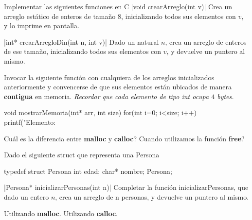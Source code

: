 \documentclass[titlepage,oneside]{book}
\begin{document}
\begin{Exercise} Implementar las siguientes funciones en C
	\Question
		|void crearArreglo(int v)|
		Crea un arreglo estático de enteros de tamaño 8, inicializando todos sus elementos con $v$, y lo imprime en pantalla.

	\Question {}|int* crearArregloDin(int n, int v)|
		Dado un natural $n$, crea un arreglo de enteros de ese tamaño, inicializando todos sus elementos con $v$, y devuelve un puntero al mismo.

	\Question Invocar la siguiente función con cualquiera de los arreglos inicializados anteriormente y convencerse de que sus elementos están ubicados de manera \textbf{contigua} en memoria. \textit{Recordar que cada elemento de tipo int ocupa $4$ bytes.}

    \begin{ccode}
    void mostrarMemoria(int* arr, int size)
    {
        for(int i=0; i<size; i++)
        {
            printf("Elemento: %
        }
    }
    \end{ccode}
\end{Exercise}

\begin{Exercise}
	Cuál es la diferencia entre {\textbf{malloc}} y {\textbf{calloc}}? Cuando utilizamos la función {\textbf{free}}?
\end{Exercise}

\begin{Exercise}
	Dado el siguiente struct que representa una Persona
    \begin{ccode}
    typedef struct Persona{
        int edad;
        char* nombre;
    } Persona;
    \end{ccode}

	|Persona* inicializarPersonas(int n)|
	Completar la función inicializarPersonas, que dado un entero $n$, crea un arreglo de n personas, y devuelve un puntero al mismo.

	\Question Utilizando \textbf{malloc}.
 	\Question Utilizando \textbf{calloc}.
\end{Exercise}

\end{document}

